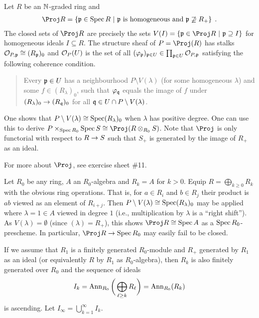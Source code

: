 \documentclass[a4paper,parskip=half,numbers=enddot, DIV=12]{scrreprt}
\begin{document}
\begin{defi}
    Let $R$ be an $\mathbb{N}$-graded ring and 
    \begin{align*}
        \Proj R = \left\{\pp\in\Spec R \st \pp \text{ is homogeneous and } \pp\not \supseteq R_+\right\}\;.
    \end{align*}
    The closed sets of $\Proj R$ are precisely the sets $V(I)=\left\{\pp\in\Proj R\st \pp\supseteq I\right\}$ for homogeneous ideals $I\subseteq R$. The structure sheaf of $P=\Proj (R)$ has stalks $\mathcal{O}_{P,\mathfrak{p}} \cong (R_{\mathfrak{p}})_0$ and $\mathcal{O}_P(U)$ is the set of all $(\varphi_{\mathfrak{p}})_{\mathfrak{p}\in U}\in \prod_{\mathfrak{p}\in U} \mathcal{O}_{P,\mathfrak{p}}$ satisfying the following coherence condition. 
    \begin{quote}
    	Every $\mathfrak{p}\in U$ has a neighbourhood $P\setminus V(\lambda)$ (for some homogeneous $\lambda$) and some $f\in (R_\lambda)_0$, such that $\varphi_{\mathfrak{q}}$ equals the image of $f$ under $(R_\lambda)_0 \morphism (R_\qq)_0$ for all $\mathfrak{q}\in U\cap P\setminus V(\lambda)$. 
    \end{quote}
\end{defi}
    One shows that $P\setminus V(\lambda) \cong \operatorname{Spec}(R_\lambda)_0$ when $\lambda$ has positive degree. One can use this to derive $P\times_{\Spec R_0} \Spec S \cong \Proj(R\otimes_{R_0} S)$. Note that $\Proj$ is only functorial with respect to $R\morphism S$ such that $S_+$ is generated by the image of $R_+$ as an ideal.
    
    For more about $\Proj$, see exercise sheet \#11.
\begin{example}
    Let $R_0$ be any ring, $A$ an $R_0$-algebra and $R_k = A$ for $k>0$. Equip $R=\bigoplus_{k\geq 0}R_k$ with the obvious ring operations. That is, for $a\in R_i$ and $b\in R_j$ their product is $ab$ viewed as an element of $R_{i+j}$. Then $P\setminus V(\lambda) \cong \operatorname{Spec}(R_\lambda)_0$ may be applied where $\lambda = 1\in A$ viewed in degree $1$ (i.e., multiplication by $\lambda$ is a ``right shift''). As $V(\lambda)=\emptyset$ (since $(\lambda)=R_+$), this shows $\Proj R\cong \Spec A$ as a $\operatorname{Spec} R_0$-prescheme. In particular, $\Proj R\morphism \Spec R_0$ may easily fail to be closed.
\end{example}
If we assume that $R_1$ is a finitely generated $R_0$-module and $R_+$ generated by $R_1$ as an ideal (or equivalently $R$ by $R_1$ as $R_0$-algebra), then $R_k$ is also finitely generated over $R_0$ and the sequence of ideals 
\begin{align*}
    I_k = \operatorname{Ann}_{R_0}\bigg(\bigoplus_{\ell\geq k} R_\ell\bigg) = \operatorname{Ann}_{R_0} (R_k)
\end{align*}
is ascending. Let $I_\infty = \bigcup_{k=1}^\infty I_k$.
\end{document}
